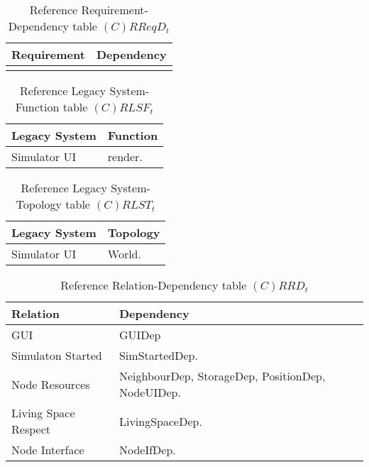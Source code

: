 \begin{table}[H]
	\centering
	\begin{tabular}{|p{4cm}|p{8cm}|}
			\hline
			\textbf{Requirement} & \textbf{Dependency} \\
			\hline
			 & \\
			\hline
		\end{tabular}
		\caption{Reference Requirement-Dependency table $(C)RReqD_t$}
	\label{tab:crreqdt}
\end{table}

\begin{table}[H]
	\centering
	\begin{tabular}{|p{4cm}|p{8cm}|}
			\hline
			\textbf{Legacy System} & \textbf{Function} \\
			\hline
			Simulator UI & render. \\
			\hline
		\end{tabular}
	\caption{Reference Legacy System-Function table $(C)RLSF_t$}
	\label{tab:crlsft}
\end{table}

\begin{table}[H]
	\centering
	\begin{tabular}{|p{4cm}|p{8cm}|}
			\hline
			\textbf{Legacy System} & \textbf{Topology} \\
			\hline
			Simulator UI & World. \\
			\hline
		\end{tabular}
	\caption{Reference Legacy System-Topology table $(C)RLST_t$}
	\label{tab:crlsTt}
\end{table}

\begin{table}[H]
	\centering
	\begin{tabular}{|p{4cm}|p{8cm}|}
			\hline
			\textbf{Relation} & \textbf{Dependency} \\
			\hline
			GUI & GUIDep \\
			\hline
			Simulaton Started & SimStartedDep. \\
			\hline
			Node Resources & NeighbourDep, StorageDep, PositionDep, NodeUIDep. \\
			\hline
			Living Space Respect & LivingSpaceDep. \\
			\hline
			Node Interface & NodeIfDep. \\
			\hline
		\end{tabular}
	\caption{Reference Relation-Dependency table $(C)RRD_t$}
	\label{tab:crrdt}
\end{table}

